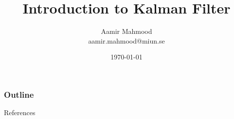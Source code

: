 \documentclass[8pt]{beamer}
\title{\textbf{Introduction to Kalman Filter}}
\author[Aamir Mahmood]{Aamir Mahmood \\ \footnotesize aamir.mahmood@miun.se}
\institute[]{Mid Sweden University}
\date{\today}
\begin{document}
\begin{frame}

\titlepage
\end{frame}


\begin{frame}[allowframebreaks]
   \frametitle{Outline}
		\tableofcontents
\end{frame}









%

\begin{frame}[allowframebreaks]{References}
  \printbibliography
\end{frame}
\end{document}
